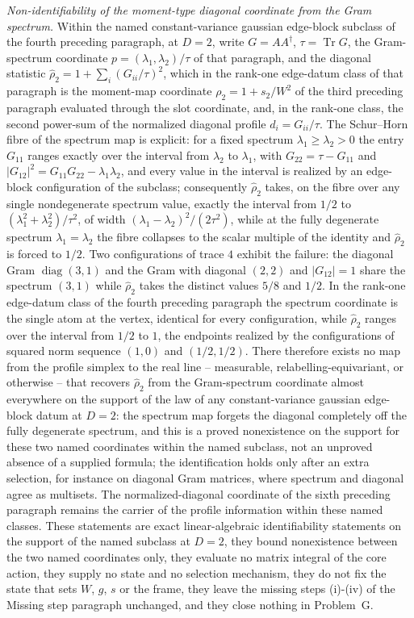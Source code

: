 \emph{Non-identifiability of the moment-type diagonal coordinate from the Gram spectrum.} Within the named constant-variance gaussian edge-block subclass of the fourth preceding paragraph, at \(D=2\), write \(G=AA^{\dagger}\), \(\tau=\operatorname{Tr}G\), the Gram-spectrum coordinate \(p=(\lambda_{1},\lambda_{2})/\tau\) of that paragraph, and the diagonal statistic \(\hat\rho_{2}=1+\sum_{i}(G_{ii}/\tau)^{2}\), which in the rank-one edge-datum class of that paragraph is the moment-map coordinate \(\rho_{2}=1+s_{2}/W^{2}\) of the third preceding paragraph evaluated through the slot coordinate, and, in the rank-one class, the second power-sum of the normalized diagonal profile \(d_{i}=G_{ii}/\tau\). The Schur--Horn fibre of the spectrum map is explicit: for a fixed spectrum \(\lambda_{1}\ge\lambda_{2}>0\) the entry \(G_{11}\) ranges exactly over the interval from \(\lambda_{2}\) to \(\lambda_{1}\), with \(G_{22}=\tau-G_{11}\) and \(\lvert G_{12}\rvert^{2}=G_{11}G_{22}-\lambda_{1}\lambda_{2}\), and every value in the interval is realized by an edge-block configuration of the subclass; consequently \(\hat\rho_{2}\) takes, on the fibre over any single nondegenerate spectrum value, exactly the interval from \(1/2\) to \((\lambda_{1}^{2}+\lambda_{2}^{2})/\tau^{2}\), of width \((\lambda_{1}-\lambda_{2})^{2}/(2\tau^{2})\), while at the fully degenerate spectrum \(\lambda_{1}=\lambda_{2}\) the fibre collapses to the scalar multiple of the identity and \(\hat\rho_{2}\) is forced to \(1/2\). Two configurations of trace \(4\) exhibit the failure: the diagonal Gram \(\operatorname{diag}(3,1)\) and the Gram with diagonal \((2,2)\) and \(\lvert G_{12}\rvert=1\) share the spectrum \((3,1)\) while \(\hat\rho_{2}\) takes the distinct values \(5/8\) and \(1/2\). In the rank-one edge-datum class of the fourth preceding paragraph the spectrum coordinate is the single atom at the vertex, identical for every configuration, while \(\hat\rho_{2}\) ranges over the interval from \(1/2\) to \(1\), the endpoints realized by the configurations of squared norm sequence \((1,0)\) and \((1/2,1/2)\). There therefore exists no map from the profile simplex to the real line -- measurable, relabelling-equivariant, or otherwise -- that recovers \(\hat\rho_{2}\) from the Gram-spectrum coordinate almost everywhere on the support of the law of any constant-variance gaussian edge-block datum at \(D=2\): the spectrum map forgets the diagonal completely off the fully degenerate spectrum, and this is a proved nonexistence on the support for these two named coordinates within the named subclass, not an unproved absence of a supplied formula; the identification holds only after an extra selection, for instance on diagonal Gram matrices, where spectrum and diagonal agree as multisets. The normalized-diagonal coordinate of the sixth preceding paragraph remains the carrier of the profile information within these named classes. These statements are exact linear-algebraic identifiability statements on the support of the named subclass at \(D=2\), they bound nonexistence between the two named coordinates only, they evaluate no matrix integral of the core action, they supply no state and no selection mechanism, they do not fix the state that sets \(W\), \(g\), \(s\) or the frame, they leave the missing steps (i)-(iv) of the Missing step paragraph unchanged, and they close nothing in Problem~G.
